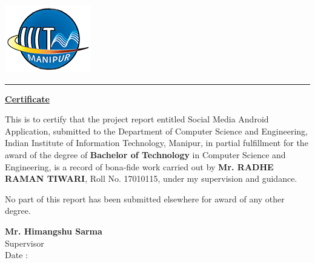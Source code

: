 

\noindent
\begin{minipage}{0.15\textwidth}
	\includegraphics[scale=0.60]{iiitm-logo.png} 
\end{minipage}%
\hfill%
\begin{minipage}{1.0\textwidth}
\begin{center}

\end{center}
\end{minipage}
\bigskip 
\noindent\rule{15cm}{0.8pt}

\begin{center}
	\textbf{\underline{ Certificate }}
\end{center}%
\begin{onehalfspace}
This is to certify that the project report entitled Social Media Android Application, submitted to the Department of Computer Science and Engineering, Indian Institute of Information Technology, Manipur, in partial fulfillment for the award of the degree of \textbf{ Bachelor of Technology} in Computer Science and Engineering, is a record of bona-fide work carried out by\textbf{ Mr. RADHE RAMAN TIWARI}, Roll No. 17010115, under my supervision and guidance.

\noindent 
No part of this report has been submitted elsewhere for award of any other degree.




\vspace*{10 ex}
\begin{center}
\tab
\textbf{Mr. Himangshu Sarma}\\
\tab
Supervisor\\

\bigskip
\hfil
Date :
\end{center}
\end{onehalfspace}
